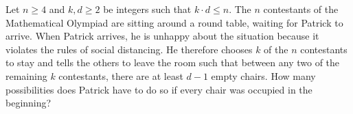 Let $n\geq 4$ and $k,d\geq 2$ be integers such that $k \cdot d \leq n$.
The $n$ contestants of the Mathematical Olympiad are sitting around a round table,
waiting for Patrick to arrive.
When Patrick arrives, he is unhappy about the situation because it violates the rules of social distancing.
He therefore chooses $k$ of the $n$ contestants to stay and tells the others to leave the room such that
between any two of the remaining $k$ contestants, there are at least $d-1$ empty chairs.
How many possibilities does Patrick have to do so if every chair was occupied in the beginning?
